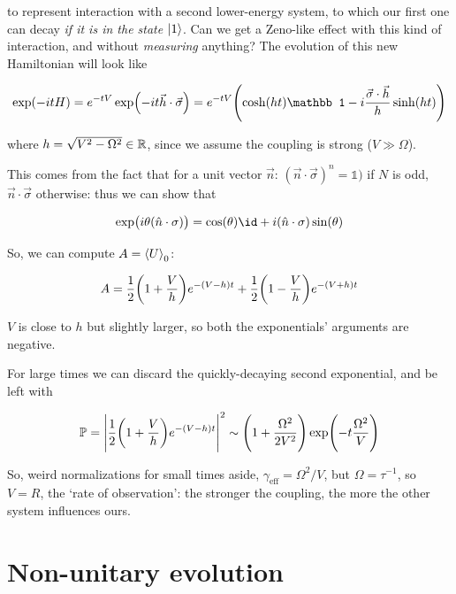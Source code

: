 \documentclass[main.tex]{subfiles}
\begin{document}
to represent interaction with a second lower-energy system, to which our first one can decay \emph{if it is in the state \(\ket{1}\)}. Can we get a Zeno-like effect with this kind of interaction, and without \emph{measuring} anything?
The evolution of this new Hamiltonian will look like

\begin{equation}
    \exp(-itH) = e^{-tV} \exp(-it \vec{h} \cdot \vec{\sigma} ) = e^{-tV} \qty(\cosh(h t)\mathbb 1 -i \frac{\vec{\sigma} \cdot \vec{h} }{h} \sinh(ht) )
\end{equation}

where \(h = \sqrt{ V^2 - \Omega^2} \in \mathbb{R}\), since we assume the coupling is strong (\(V \gg \Omega\)).

This comes from the fact that for a unit vector \(\vec{n} \): \((\vec{n} \cdot \vec{\sigma})^n = \mathbb 1  )\) if \(N\) is odd, \(\vec{n} \cdot \vec{\sigma} \) otherwise: thus we can show that

\begin{equation}
    \exp(i \theta (\hat{n} \cdot \sigma )) = \cos(\theta) \id + i (\hat{n} \cdot \sigma) \sin(\theta )
\end{equation}

So, we can compute \(A = \expval{U} _0\):

\begin{equation}
    A = \frac{1}{2} \qty(1 + \frac{V}{h})e^{-(V-h)t}+
    \frac{1}{2} \qty(1 - \frac{V}{h})e^{-(V+h)t}
\end{equation}

\(V\) is close to \(h\) but slightly larger, so both the exponentials' arguments are negative.

For large times we can discard the quickly-decaying second exponential, and be left with

\begin{equation}
    \P = \abs{\frac{1}{2} \qty(1 + \frac{V}{h})e^{-(V-h)t}}^2
    \sim \qty(1 + \frac{\Omega^2}{2 V^2}) \exp(-t \frac{\Omega^2}{V})
\end{equation}

So, weird normalizations for small times aside, \(\gamma _{\text{eff}} = \Omega^2 /V \), but \(\Omega = \tau^{-1}\), so \(V = R\), the `rate of observation': the stronger the coupling, the more the other system influences ours.

\section{Non-unitary evolution}
\end{document}
